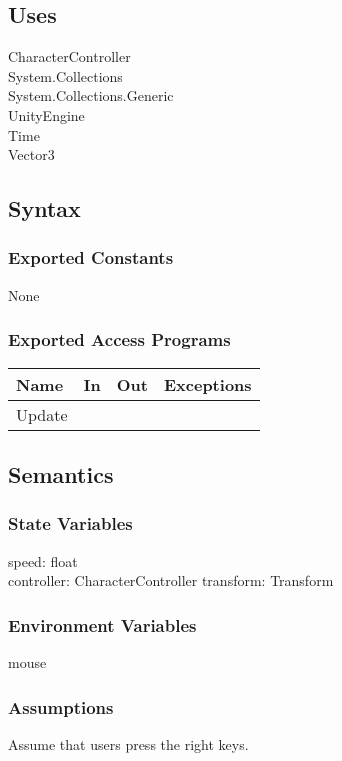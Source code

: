 \documentclass[12pt, titlepage]{article}
\begin{document}
\subsection{Uses}

CharacterController\\
System.Collections\\
System.Collections.Generic\\
UnityEngine\\
Time\\
Vector3

\subsection{Syntax}

\subsubsection{Exported Constants}
None
\subsubsection{Exported Access Programs}

\begin{center}
\begin{tabular}{|l|l|l|p{5cm}|}
\hline
\textbf{Name} & \textbf{In} & \textbf{Out} & \textbf{Exceptions} \\
\hline
Update &  &  &  \\
\hline
\end{tabular}
\end{center}

\subsection{Semantics}

\subsubsection{State Variables}
speed: float\\
controller: CharacterController
transform: Transform
\subsubsection{Environment Variables}

mouse

\subsubsection{Assumptions}
Assume that users press the right keys.
\end{document}
